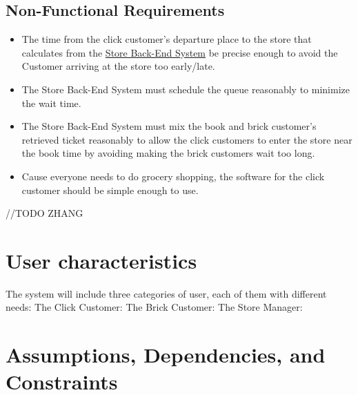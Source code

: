 \documentclass[a4paper,12pt]{report}
\begin{document}
\subsection{Non-Functional Requirements}
\begin{itemize}
	\item The time from the click customer's departure place to the store that calculates from the \hyperref[Definitions]{Store Back-End System} be precise enough to avoid the Customer arriving at the store too early/late.
	\item The Store Back-End System must schedule the queue reasonably to minimize the wait time.
	\item The Store Back-End System must mix the book and brick customer's retrieved ticket reasonably to allow the click customers to enter the store near the book time by avoiding making the brick customers wait too long.
	\item Cause everyone needs to do grocery shopping, the software for the click customer should be simple enough to use.
\end{itemize}


//TODO ZHANG
\section{User characteristics}
The system will include three categories of user, each of them with different needs:
The Click Customer:
The Brick Customer:
The Store Manager:


\section{Assumptions, Dependencies, and Constraints}
\end{document}
